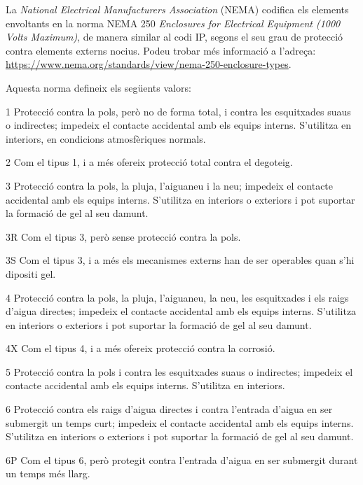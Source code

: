 La \textit{National Electrical Manufacturers Association} (NEMA)
codifica els elements envoltants en la norma NEMA 250 \textit{Enclosures for Electrical Equipment (1000 Volts Maximum)}, de manera similar al codi IP, segons el seu grau de protecció contra elements externs nocius. Podeu trobar més informació a l'adreça: \href{https://www.nema.org/standards/view/nema-250-enclosure-types}{https:/\!\!/www.nema.org/standards/view/nema-250-enclosure-types}.

Aquesta norma defineix els següents valors:

\begin{list}{}
   {\setlength{\labelwidth}{10mm} \setlength{\leftmargin}{15mm} \setlength{\labelsep}{5mm}}
   \item[1] Protecció contra la pols, però no de forma total, i contra les esquitxades suaus o indirectes; impedeix el contacte accidental amb els equips interns. S'utilitza en interiors, en condicions atmosfèriques normals.
   \item[2] Com el tipus 1, i a més ofereix protecció total contra el degoteig.
   \item[3] Protecció contra la pols, la pluja, l'aiguaneu i la neu; impedeix el contacte accidental amb els equips interns. S'utilitza en interiors o exteriors i pot suportar la formació de gel al seu damunt.
   \item[3R] Com el tipus 3, però sense protecció contra la pols.
   \item[3S] Com el tipus 3, i a més els mecanismes externs han de ser operables quan s'hi dipositi gel.
    \item[4] Protecció contra la pols, la pluja, l'aiguaneu, la neu, les esquitxades i els raigs d'aigua directes; impedeix el contacte accidental amb els equips interns. S'utilitza en interiors o exteriors i pot suportar la formació de gel al seu damunt.
   \item[4X] Com el tipus 4, i a més ofereix protecció contra la corrosió.
   \item[5] Protecció contra la pols i contra les esquitxades suaus o indirectes; impedeix el contacte accidental amb els equips interns. S'utilitza en interiors.
   \item[6] Protecció contra els raigs d'aigua directes i contra l'entrada d'aigua en ser submergit un temps curt; impedeix el contacte accidental amb els equips interns. S'utilitza en interiors o exteriors i pot suportar la formació de gel al seu damunt.
   \item[6P] Com el tipus 6, però protegit contra l'entrada d'aigua en ser submergit durant un temps més llarg.

\end{list}
